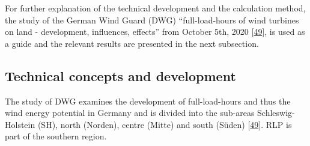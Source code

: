 \documentclass[a4paper,11pt]{article}
\begin{document}
For further explanation of the technical development and the calculation method, the study of the German Wind Guard (DWG) ``full-load-hours of wind turbines on land - development, influences, effects'' from October 5th, 2020 {[}\protect\hyperlink{ref-RasmusBorrmannDr.KnudRehfeldtDr.DennisKruse.2020}{49}{]}, is used as a guide and the relevant results are presented in the next subsection.

\hypertarget{technical-concepts-and-development}{%
\subsection{Technical concepts and development}\label{technical-concepts-and-development}}

The study of DWG examines the development of full-load-hours and thus the wind energy potential in Germany and is divided into the sub-areas Schleswig-Holstein (SH), north (Norden), centre (Mitte) and south (Süden) {[}\protect\hyperlink{ref-RasmusBorrmannDr.KnudRehfeldtDr.DennisKruse.2020}{49}{]}. RLP is part of the southern region.
\end{document}
